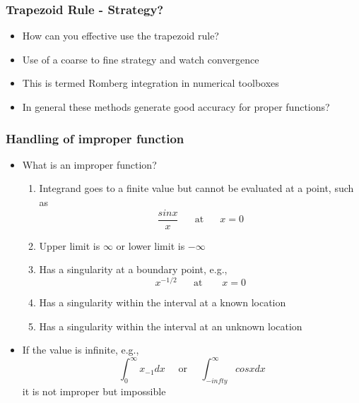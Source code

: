 \documentclass[10pt]{beamer}
\begin{document}
\begin{frame}
  \frametitle{Trapezoid Rule - Strategy?}
  \begin{itemize}
  \item How can you effective use the trapezoid rule?
    \pause
  \item Use of a coarse to fine strategy and watch convergence
  \item This is termed Romberg integration in numerical toolboxes
  \item In general these methods generate good accuracy for proper functions? 
  \end{itemize}
\end{frame}

\begin{frame}
  \frametitle{Handling of improper function}
  \begin{itemize}
  \item What is an improper function?
    \pause
    \begin{enumerate}
    \item Integrand goes to a finite value but cannot be evaluated at a point, such as
      \[
        \frac{sin x}{x} \mbox{ ~~~ at ~~~ } x=0
      \]
    \item Upper limit is $\infty$ or lower limit is $-\infty$
    \item Has a singularity at a boundary point, e.g.,
      \[
        x^{-1/2} \mbox{~~~~ at ~~~~~} x = 0
      \]
    \item Has a singularity within the interval at a known location
    \item Has a singularity within the interval at an unknown location
    \end{enumerate}
  \item If the value is infinite, e.g.,
    \[
      \int_0^{\infty} x_{-1} dx \mbox{~~~~or~~~~} \int_{-infty}^{\infty} cos x dx
    \] it is not improper but impossible
  \end{itemize}
\end{frame}
\end{document}
